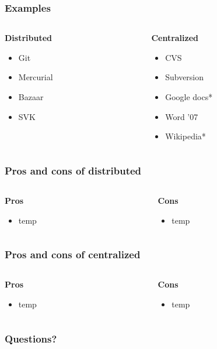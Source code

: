 \documentclass[8pt]{beamer}
\begin{document}
\begin{frame}
	\frametitle{Examples}
	\begin{columns}[T]
		\begin{column}{0.5\textwidth}
				\textbf{Distributed}
				\begin{itemize}
					\item Git
					\item Mercurial
					\item Bazaar
					\item SVK
				\end{itemize}
		\end{column}
		\begin{column}{0.5\textwidth}
			\textbf{Centralized}
			\begin{itemize}
				\item CVS
				\item Subversion
				\item Google docs*
				\item Word '07
				\item Wikipedia*
			\end{itemize}
		\end{column}
	\end{columns}
\end{frame}

\begin{frame}
	\frametitle{Pros and cons of distributed}
	\begin{columns}[T]
		\begin{column}{0.5\textwidth}
			\textbf{Pros}
			\begin{itemize}
				\item temp
			\end{itemize}
		\end{column}
		\begin{column}{0.5\textwidth}
			\textbf{Cons}
			\begin{itemize}
				\item temp
			\end{itemize}
		\end{column}
	\end{columns}
\end{frame}

\begin{frame}
	\frametitle{Pros and cons of centralized}
	\begin{columns}[T]
		\begin{column}{0.5\textwidth}
			\textbf{Pros}
			\begin{itemize}
				\item temp
			\end{itemize}
		\end{column}
		\begin{column}{0.5\textwidth}
			\textbf{Cons}
			\begin{itemize}
				\item temp
			\end{itemize}
		\end{column}
	\end{columns}
\end{frame}

\begin{frame}
	\frametitle{Questions?}
\end{frame}
\end{document}
